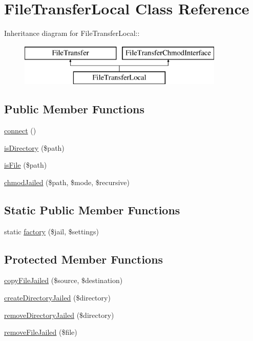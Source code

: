 \hypertarget{classFileTransferLocal}{
\section{FileTransferLocal Class Reference}
\label{classFileTransferLocal}
}
Inheritance diagram for FileTransferLocal::\begin{figure}[H]
\begin{center}
\leavevmode
\includegraphics[height=2cm]{classFileTransferLocal}
\end{center}
\end{figure}
\subsection*{Public Member Functions}
\begin{DoxyCompactItemize}
\item 
\hyperlink{classFileTransferLocal_a676f0b89d8271d716a05cd92b55dfa60}{connect} ()
\item 
\hyperlink{classFileTransferLocal_ae17e18a84f3edd9337b3c1ca9dcbd3cf}{isDirectory} (\$path)
\item 
\hyperlink{classFileTransferLocal_a6421f45b2570ef9591aae36b1f3ea72e}{isFile} (\$path)
\item 
\hyperlink{classFileTransferLocal_a37439f6a788a20b31230cb5205d0272a}{chmodJailed} (\$path, \$mode, \$recursive)
\end{DoxyCompactItemize}
\subsection*{Static Public Member Functions}
\begin{DoxyCompactItemize}
\item 
static \hyperlink{classFileTransferLocal_aee03476a89446c2e6fb8d9a666739bd5}{factory} (\$jail, \$settings)
\end{DoxyCompactItemize}
\subsection*{Protected Member Functions}
\begin{DoxyCompactItemize}
\item 
\hyperlink{classFileTransferLocal_accbfe365fe1b9f912eaff9f4b3988de0}{copyFileJailed} (\$source, \$destination)
\item 
\hyperlink{classFileTransferLocal_aa578801cec3774f44a51d6b33cd5b1fd}{createDirectoryJailed} (\$directory)
\item 
\hyperlink{classFileTransferLocal_a59e9071509cb3abc3eeb407151b2e72d}{removeDirectoryJailed} (\$directory)
\item 
\hyperlink{classFileTransferLocal_aa7e7102eef93d90da81df65bb2033d93}{removeFileJailed} (\$file)
\end{DoxyCompactItemize}


